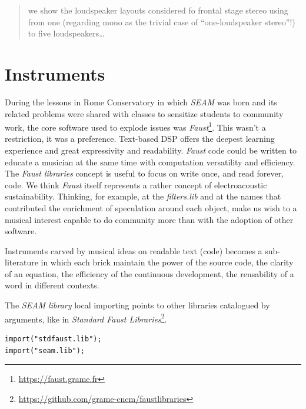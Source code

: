 \documentclass{article}
\begin{document}
\begin{quotation}
we show the loudspeaker layouts considered fo frontal stage stereo using from one (regarding mono as the trivial case of “one-loudspeaker stereo”!) to five loudspeakers… \cite{mg92pdmsss}
\end{quotation}

\section{Instruments}
\label{sec:instruments}

During the lessons in Rome Conservatory in which \emph{SEAM} was born and its
related problems were shared with classes to sensitize students to community
work, the core software used to explode issues was \emph{Faust}\footnote{
\url{https://faust.grame.fr}}. This wasn't a restriction, it was a preference.
Text-based DSP offers the deepest learning experience and great expressivity
and readability. \emph{Faust} code could be written to educate a musician at
the same time with computation versatility and efficiency. The \emph{Faust
libraries} concept is useful to focus on write once, and read forever, code.
We think \emph{Faust} itself represents a rather concept of electroacoustic
sustainability. Thinking, for example, at the \emph{filters.lib} and at the
names that contributed the enrichment of speculation around each object, make
us wish to a musical interest capable to do community more than with the
adoption of other software.

Instruments carved by musical ideas on readable text (code) becomes a
sub-literature in which each brick maintain the power of the source code, the
clarity of an equation, the efficiency of the continuous development, the
reusability of a word in different contexts.

The \emph{SEAM library} local importing points to other libraries catalogued
by arguments, like in \emph{Standard Faust Libraries}\footnote{
\url{https://github.com/grame-cncm/faustlibraries}}.

\begin{lstlisting}
import("stdfaust.lib");
import("seam.lib");
\end{lstlisting}

%
\end{document}
